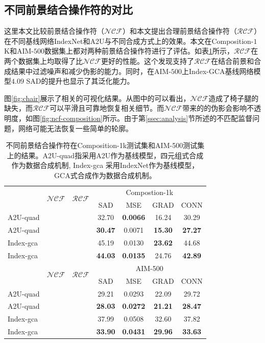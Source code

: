 \documentclass[supercite]{HustGraduPaper}
\begin{document}
	\subsection{不同前景结合操作符的对比}
	这里本文比较前景结合操作符（$\mathcal{NCF}$）和本文提出合理前景结合操作符（$\mathcal{RCF}$）在不同基线网络IndexNet和A2U与不同合成方式上的效果。本文在Composition-$1$K和AIM-$500$数据集上都对两种前景结合操作符进行了评估。如表\ref{tab:foreground-combination}所示，$\mathcal{RCF}$在两个数据集上均取得了比$\mathcal{NCF}$更好的性能。这个发现支持了$\mathcal{RCF}$在结合前景和合成结果中过滤噪声和减少伪影的能力。同时，在AIM-$500$上Index-GCA基线网络模型$4.09$ SAD的提升也显示了其泛化能力。

	
		
	图\ref{fig:chair}展示了相关的可视化结果。从图中的可以看出，$\mathcal{NCF}$造成了椅子腿的缺失，而$\mathcal{RCF}$可以平滑且可靠地恢复相关细节。而$\mathcal{NCF}$带来的的伪影会影响不透明度，如图\ref{fig:ncf-composition}所示。由于第\ref{ssec:analysis}节所述的不匹配监督问题，网络可能无法恢复一些简单的轮廓。	

	\begin{table}[htbp]
		\centering
		\caption{不同前景结合操作符在Composition-1k测试集和AIM-500测试集上的结果。A2U-quad指采用A2U作为基线模型，四元组式合成作为数据合成机制, Index-gca 采用IndexNet作为基线模型，GCA式合成作为数据合成机制。}
		\label{tab:foreground-combination}
		\begin{tabular}{@{}lcccccc@{}}
		\toprule
		 & \multirow{2}{*}{$\mathcal{NCF}$} & \multirow{2}{*}{$\mathcal{RCF}$}& \multicolumn{4}{c}{Compostion-1k} \\
		 & && SAD & MSE & GRAD & CONN \\
		 \midrule
		 A2U-quad & \Checkmark &  & 32.70 & \textbf{0.0066} & 16.24 & 30.29 \\
		 A2U-quad &  & \Checkmark & \textbf{30.47} & 0.0071 & \textbf{15.30} & \textbf{27.27} \\
		 Index-gca & \Checkmark &  &45.19  &0.0130  & \textbf{23.62}  &44.68  \\
		 Index-gca &  & \Checkmark & \textbf{44.03} & \textbf{0.0135} &24.76 & \textbf{42.89}\\
		 \midrule
		  & \multirow{2}{*}{$\mathcal{NCF}$} & \multirow{2}{*}{$\mathcal{RCF}$}&\multicolumn{4}{c}{AIM-500} \\
		  &  &  & SAD & MSE & GRAD & CONN \\
		 \midrule
		 A2U-quad & \Checkmark &  & 29.21 & 0.0293 & 22.09 & 29.72 \\
		 A2U-quad &  & \Checkmark & \textbf{28.03} & \textbf{0.0272} & \textbf{21.21} & \textbf{28.47}\\
		 Index-gca & \Checkmark &  &37.99  &0.0508  &32.60  &37.82  \\
		 Index-gca &  & \Checkmark & \textbf{33.90} & \textbf{0.0431} & \textbf{29.96} & \textbf{33.63}\\
		\bottomrule
		\end{tabular}
	\end{table}
\end{document}
